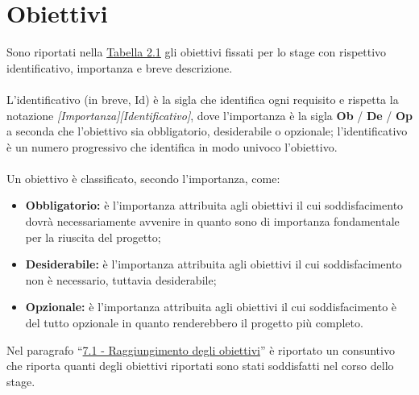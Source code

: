 \section{Obiettivi}
\label{duetre}
Sono riportati nella \hyperref[tab:obiettivi]{Tabella 2.1} gli obiettivi fissati per lo stage con rispettivo identificativo, importanza e breve descrizione. \\
\\
L'identificativo (in breve, Id) è la sigla che identifica ogni requisito e rispetta la notazione \textit{[Importanza][Identificativo]}, dove l'importanza è la sigla \textbf{Ob} / \textbf{De} / \textbf{Op} a seconda che l'obiettivo sia obbligatorio, desiderabile o opzionale; l'identificativo è un numero progressivo che identifica in modo univoco l'obiettivo. \\
\\
Un obiettivo è classificato, secondo l'importanza, come:
    \begin{itemize}
        \item \textbf{Obbligatorio:} è l'importanza attribuita agli obiettivi il cui soddisfacimento dovrà necessariamente avvenire in quanto sono di importanza fondamentale per la riuscita del progetto;
        \item \textbf{Desiderabile:} è l'importanza attribuita agli obiettivi il cui soddisfacimento non è necessario, tuttavia desiderabile;
        \item \textbf{Opzionale:} è l'importanza attribuita agli obiettivi il cui soddisfacimento è del tutto opzionale in quanto renderebbero il progetto più completo.
    \end{itemize}%

\noindent
Nel paragrafo ``{\hyperref[setteuno]{7.1 - Raggiungimento degli obiettivi}}'' è riportato un consuntivo che riporta quanti degli obiettivi riportati sono stati soddisfatti nel corso dello stage.

